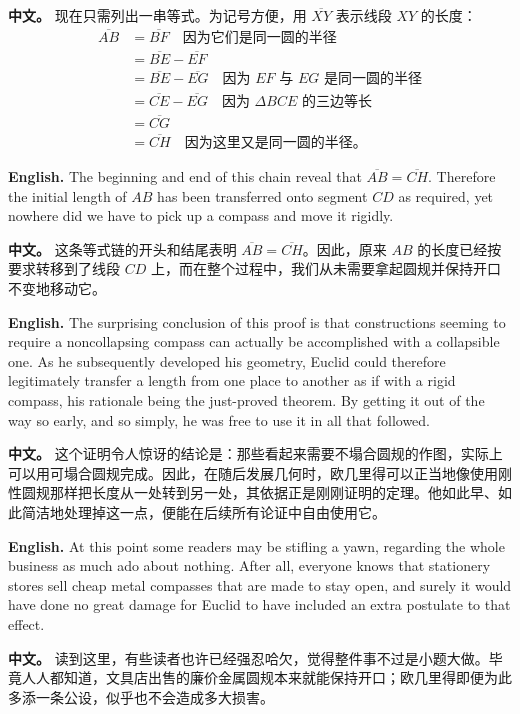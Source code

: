 \noindent\textbf{中文。} 现在只需列出一串等式。为记号方便，用 $\overline{XY}$ 表示线段 $XY$ 的长度：
\[
\begin{array}{rl}
\overline{AB} &= \overline{BF} \quad \text{因为它们是同一圆的半径}\\
&= \overline{BE}-\overline{EF}\\
&= \overline{BE}-\overline{EG} \quad \text{因为 } EF \text{ 与 } EG \text{ 是同一圆的半径}\\
&= \overline{CE}-\overline{EG} \quad \text{因为 } \Delta BCE \text{ 的三边等长}\\
&= \overline{CG}\\
&= \overline{CH} \quad \text{因为这里又是同一圆的半径。}
\end{array}
\]

\noindent\textbf{English.} The beginning and end of this chain reveal that $\overline{AB}=\overline{CH}$. Therefore the initial length of $AB$ has been transferred onto segment $CD$ as required, yet nowhere did we have to pick up a compass and move it rigidly.

\noindent\textbf{中文。} 这条等式链的开头和结尾表明 $\overline{AB}=\overline{CH}$。因此，原来 $AB$ 的长度已经按要求转移到了线段 $CD$ 上，而在整个过程中，我们从未需要拿起圆规并保持开口不变地移动它。

\noindent\textbf{English.} The surprising conclusion of this proof is that constructions seeming to require a noncollapsing compass can actually be accomplished with a collapsible one. As he subsequently developed his geometry, Euclid could therefore legitimately transfer a length from one place to another as if with a rigid compass, his rationale being the just-proved theorem. By getting it out of the way so early, and so simply, he was free to use it in all that followed.

\noindent\textbf{中文。} 这个证明令人惊讶的结论是：那些看起来需要不塌合圆规的作图，实际上可以用可塌合圆规完成。因此，在随后发展几何时，欧几里得可以正当地像使用刚性圆规那样把长度从一处转到另一处，其依据正是刚刚证明的定理。他如此早、如此简洁地处理掉这一点，便能在后续所有论证中自由使用它。

\noindent\textbf{English.} At this point some readers may be stifling a yawn, regarding the whole business as much ado about nothing. After all, everyone knows that stationery stores sell cheap metal compasses that are made to stay open, and surely it would have done no great damage for Euclid to have included an extra postulate to that effect.

\noindent\textbf{中文。} 读到这里，有些读者也许已经强忍哈欠，觉得整件事不过是小题大做。毕竟人人都知道，文具店出售的廉价金属圆规本来就能保持开口；欧几里得即便为此多添一条公设，似乎也不会造成多大损害。

